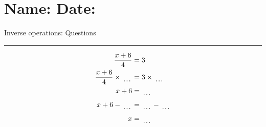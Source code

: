 \documentclass[12pt]{article}
\def \HeadingQuestions {\section*{\Large Name: \underline{\hspace{8cm}} \hfill Date: \underline{\hspace{3cm}}} \vspace{-3mm}
{Inverse operations: Questions} \vspace{1pt}\hrule}
\newcounter{minipagecount}
\begin{document}
\HeadingQuestions
\vspace{1mm}
\begin{multicols}{2}
\noindent{(\theminipagecount)}\hspace{0.1mm} %
\begin{minipage}[t]{0.45\textwidth} %
    \vspace{-26pt}  %
    \raggedright %
    \begin{align*} %
        \frac{x + 6}{4} &= 3\\
        \frac{x + 6}{4} \times\dotuline{\hspace{5mm}} &= 3 \times\dotuline{\hspace{5mm}}\\
        x + 6 &= \dotuline{\hspace{5mm}}\\
        x + 6 - \dotuline{\hspace{5mm}} &= \dotuline{\hspace{5mm}} - \dotuline{\hspace{5mm}}\\
        x &= \dotuline{\hspace{5mm}}\\
    \end{align*}
\end{minipage} %
\noindent{(\theminipagecount)}\hspace{0.1mm} %
\begin{minipage}[t]{0.45\textwidth} %
    \vspace{-26pt}  %

\end{minipage}
\end{multicols}
\end{document}
